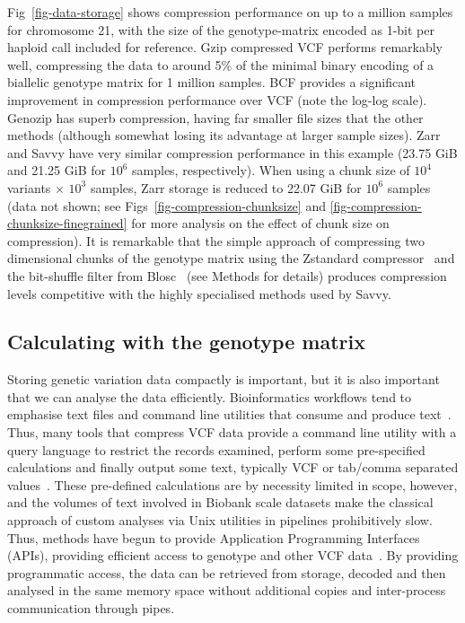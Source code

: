 \documentclass[a4paper,num-refs]{oup-contemporary}
\begin{document}
Fig~\ref{fig-data-storage} shows compression performance
on up to a million samples for chromosome 21, with
the size of the genotype-matrix encoded as 1-bit per haploid
call included for reference.
Gzip compressed VCF performs remarkably well, compressing
the data to around 5\% of the
minimal binary encoding of a biallelic genotype matrix
for 1 million samples.
BCF provides a significant improvement in compression
performance over VCF (note the log-log scale). Genozip has
superb compression, having far smaller file sizes that the
other methods (although somewhat losing its advantage at
larger sample sizes). Zarr and Savvy have
very similar compression performance in this example (23.75 GiB
and 21.25 GiB for $10^6$ samples, respectively). When using
a chunk size of $10^4$ variants $\times$ $10^3$ samples, Zarr
storage is reduced to 22.07 GiB for $10^6$ samples (data not shown;
see Figs~\ref{fig-compression-chunksize} and \ref{fig-compression-chunksize-finegrained}
for more analysis on the effect of chunk size on compression).
It is remarkable that the simple approach of compressing
two dimensional chunks of the genotype matrix
using the Zstandard compressor~\citep{collet2021rfc} and the
bit-shuffle filter from Blosc~\cite{alted2010modern}
(see Methods for details) produces
compression levels competitive with the highly specialised methods
used by Savvy.

\subsection{Calculating with the genotype matrix}
Storing genetic variation data compactly is important, but it is also
important that we can analyse the data efficiently. Bioinformatics
workflows tend to emphasise text files and command line utilities
that consume and produce text~\citep[e.g.][]{buffalo2015bioinformatics}.
Thus, many tools that compress VCF data provide a command line
utility with a query language to restrict the records
examined, perform some pre-specified calculations and finally
output some text, typically VCF or tab/comma separated
values~\citep{
layer2016efficient, %
li2016bgt, %
danek2018gtc, %
lin2020sparse, %
lan2020genozip,lan2021genozip, %
zhang2023gbc,%
luo2024gsc}. %
These pre-defined calculations are by necessity limited in scope, however,
and the volumes of text involved in Biobank scale datasets
make the classical approach of custom
analyses via Unix utilities in pipelines prohibitively slow. Thus,
methods have begun to provide Application Programming Interfaces
(APIs), providing efficient access to genotype and other VCF
data~\cite[e.g.][]{kelleher2013processing,lefaive2021sparse,
wertenbroek2022xsi}. By providing programmatic access,
the data can be retrieved from storage, decoded and then analysed
in the same memory space without additional copies and
inter-process communication through pipes.
\end{document}
